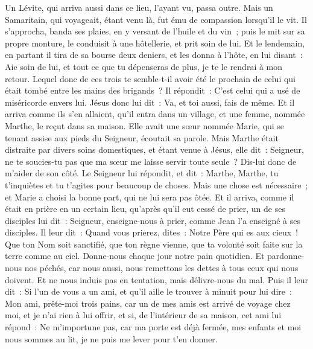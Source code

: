 \begin{multicols}{2}
Un Lévite, qui arriva aussi dans ce lieu, l'ayant vu, passa outre.
Mais un Samaritain, qui voyageait, étant venu là, fut ému de compassion lorsqu'il le vit.
Il s'approcha, banda ses plaies, en y versant de l'huile et du vin~; puis le mit sur sa propre monture, le conduisit à une hôtellerie, et prit soin de lui.
Et le lendemain, en partant il tira de sa bourse deux deniers, et les donna à l'hôte, en lui disant~: Aie soin de lui, et tout ce que tu dépenseras de plus, je te le rendrai à mon retour.
Lequel donc de ces trois te semble-t-il avoir été le prochain de celui qui était tombé entre les mains des brigands~?
Il répondit~: C'est celui qui a usé de miséricorde envers lui. Jésus donc lui dit~: Va, et toi aussi, fais de même.
Et il arriva comme ils s'en allaient, qu'il entra dans un village, et une femme, nommée Marthe, le reçut dans sa maison.
Elle avait une sœur nommée Marie, qui se tenant assise aux pieds du Seigneur, écoutait sa parole.
Mais Marthe était distraite par divers soins domestiques, et étant venue à Jésus, elle dit~: Seigneur, ne te soucies-tu pas que ma sœur me laisse servir toute seule~? Dis-lui donc de m'aider de son côté.
Le Seigneur lui répondit, et dit~: Marthe, Marthe, tu t'inquiètes et tu t'agites pour beaucoup de choses.
Mais une chose est nécessaire~; et Marie a choisi la bonne part, qui ne lui sera pas ôtée.
\VerseOne{}Et il arriva, comme il était en prière en un certain lieu, qu'après qu'il eut cessé de prier, un de ses disciples lui dit~: Seigneur, enseigne-nous à prier, comme Jean l'a enseigné à ses disciples.
Il leur dit~: Quand vous prierez, dites~: Notre Père qui es aux cieux~! Que ton Nom soit sanctifié, que ton règne vienne, que ta volonté soit faite sur la terre comme au ciel.
Donne-nous chaque jour notre pain quotidien.
Et pardonne-nous nos péchés, car nous aussi, nous remettons les dettes à tous ceux qui nous doivent. Et ne nous induis pas en tentation, mais délivre-nous du mal.
Puis il leur dit~: Si l'un de vous a un ami, et qu'il aille le trouver à minuit pour lui dire~: Mon ami, prête-moi trois pains,
car un de mes amis est arrivé de voyage chez moi, et je n'ai rien à lui offrir,
et si, de l'intérieur de sa maison, cet ami lui répond~: Ne m'importune pas, car ma porte est déjà fermée, mes enfants et moi nous sommes au lit, je ne puis me lever pour t'en donner.

\end{multicols}
